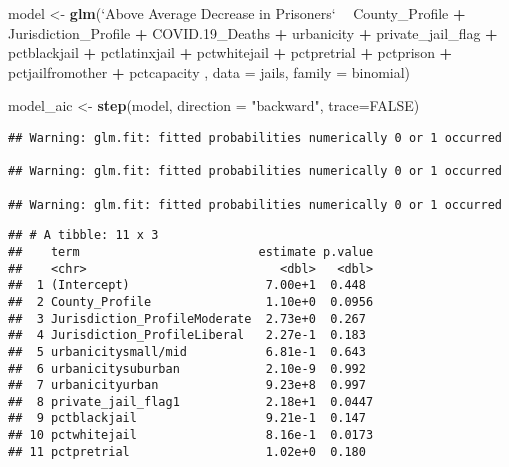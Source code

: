 \documentclass[
]{article}
\newenvironment{Shaded}{\begin{snugshade}}{\end{snugshade}}
\newcommand{\DataTypeTok}[1]{\textcolor[rgb]{0.13,0.29,0.53}{#1}}
\newcommand{\FloatTok}[1]{\textcolor[rgb]{0.00,0.00,0.81}{#1}}
\newcommand{\KeywordTok}[1]{\textcolor[rgb]{0.13,0.29,0.53}{\textbf{#1}}}
\newcommand{\NormalTok}[1]{#1}
\newcommand{\OperatorTok}[1]{\textcolor[rgb]{0.81,0.36,0.00}{\textbf{#1}}}
\newcommand{\OtherTok}[1]{\textcolor[rgb]{0.56,0.35,0.01}{#1}}
\newcommand{\StringTok}[1]{\textcolor[rgb]{0.31,0.60,0.02}{#1}}
\begin{document}
\begin{Shaded}
\begin{Highlighting}[]
\NormalTok{model <-}\StringTok{ }\KeywordTok{glm}\NormalTok{(}\StringTok{`}\DataTypeTok{Above Average Decrease in Prisoners}\StringTok{`} \OperatorTok{~}\StringTok{ }\NormalTok{County_Profile }\OperatorTok{+}
\StringTok{                }\NormalTok{Jurisdiction_Profile }\OperatorTok{+}\StringTok{ }\NormalTok{COVID}\FloatTok{.19}\NormalTok{_Deaths }\OperatorTok{+}\StringTok{ }\NormalTok{urbanicity }\OperatorTok{+}\StringTok{ }\NormalTok{private_jail_flag }\OperatorTok{+}\StringTok{ }\NormalTok{pctblackjail }\OperatorTok{+}\StringTok{ }\NormalTok{pctlatinxjail }\OperatorTok{+}\StringTok{ }\NormalTok{pctwhitejail }\OperatorTok{+}\StringTok{ }\NormalTok{pctpretrial }\OperatorTok{+}\StringTok{ }\NormalTok{pctprison }\OperatorTok{+}\StringTok{ }\NormalTok{pctjailfromother }\OperatorTok{+}\StringTok{ }\NormalTok{pctcapacity , }\DataTypeTok{data =}\NormalTok{ jails, }\DataTypeTok{family =}\NormalTok{ binomial)}

\NormalTok{model_aic <-}\StringTok{ }\KeywordTok{step}\NormalTok{(model, }\DataTypeTok{direction =} \StringTok{"backward"}\NormalTok{, }\DataTypeTok{trace=}\OtherTok{FALSE}\NormalTok{) }
\end{Highlighting}
\end{Shaded}

\begin{verbatim}
## Warning: glm.fit: fitted probabilities numerically 0 or 1 occurred

## Warning: glm.fit: fitted probabilities numerically 0 or 1 occurred

## Warning: glm.fit: fitted probabilities numerically 0 or 1 occurred
\end{verbatim}

\begin{Shaded}
\end{Shaded}

\begin{verbatim}
## # A tibble: 11 x 3
##    term                         estimate p.value
##    <chr>                           <dbl>   <dbl>
##  1 (Intercept)                   7.00e+1  0.448 
##  2 County_Profile                1.10e+0  0.0956
##  3 Jurisdiction_ProfileModerate  2.73e+0  0.267 
##  4 Jurisdiction_ProfileLiberal   2.27e-1  0.183 
##  5 urbanicitysmall/mid           6.81e-1  0.643 
##  6 urbanicitysuburban            2.10e-9  0.992 
##  7 urbanicityurban               9.23e+8  0.997 
##  8 private_jail_flag1            2.18e+1  0.0447
##  9 pctblackjail                  9.21e-1  0.147 
## 10 pctwhitejail                  8.16e-1  0.0173
## 11 pctpretrial                   1.02e+0  0.180
\end{verbatim}
\end{document}
